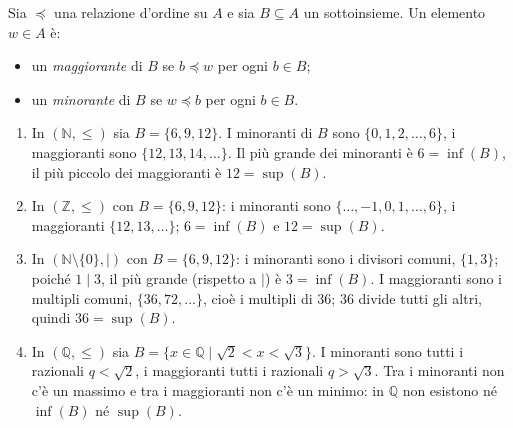 \documentclass[11pt,a4paper]{article}
\begin{document}
\begin{definizione}
Sia $\preceq$ una relazione d'ordine su $A$ e sia $B \subseteq A$ un
sottoinsieme. Un elemento $w \in A$ è:
\begin{itemize}
    \item un \emph{maggiorante} di $B$ se $b \preceq w$ per ogni
          $b \in B$;
    \item un \emph{minorante} di $B$ se $w \preceq b$ per ogni $b \in B$.
\end{itemize}
\end{definizione}

\begin{esempio}
\leavevmode
\begin{enumerate}
    \item In $(\mathbb{N}, \leq)$ sia $B = \{6, 9, 12\}$.
          I minoranti di $B$ sono $\{0, 1, 2, \dots, 6\}$, i maggioranti
          sono $\{12, 13, 14, \dots\}$. Il più grande dei minoranti è
          $6 = \inf(B)$, il più piccolo dei maggioranti è
          $12 = \sup(B)$.

    \item In $(\mathbb{Z}, \leq)$ con $B = \{6, 9, 12\}$: i minoranti sono
          $\{\dots,\allowbreak -1,\allowbreak 0,\allowbreak 1,\allowbreak \dots,\allowbreak 6\}$, i maggioranti
          $\{12, 13, \dots\}$; $6 = \inf(B)$ e $12 = \sup(B)$.

    \item In $(\mathbb{N} \setminus \{0\}, \mid)$ con $B = \{6, 9, 12\}$:
          i minoranti sono i divisori comuni, $\{1, 3\}$; poiché $1 \mid 3$,
          il più grande (rispetto a $\mid$) è $3 = \inf(B)$. I maggioranti
          sono i multipli comuni, $\{36, 72, \dots\}$, cioè i multipli di
          $36$; $36$ divide tutti gli altri, quindi $36 = \sup(B)$.

    \item In $(\mathbb{Q}, \leq)$ sia
          $B = \{x \in \mathbb{Q} \mid \sqrt{2} < x < \sqrt{3}\}$.
          I minoranti sono tutti i razionali $q < \sqrt{2}$, i maggioranti
          tutti i razionali $q > \sqrt{3}$. Tra i minoranti non c'è un
          massimo e tra i maggioranti non c'è un minimo: in $\mathbb{Q}$
          non esistono né $\inf(B)$ né $\sup(B)$.
\end{enumerate}
\end{esempio}
\end{document}

